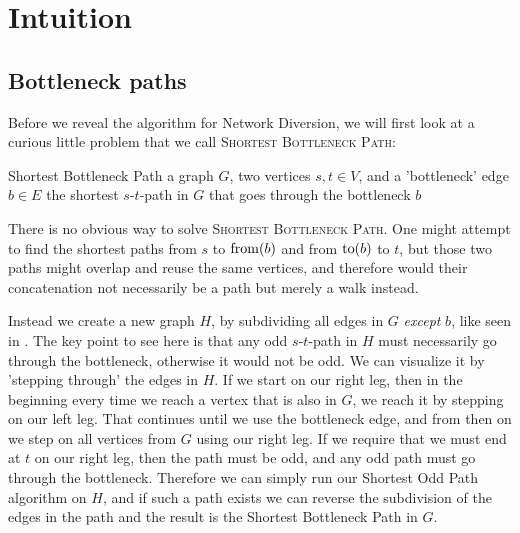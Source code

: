 \section{Intuition}
\subsection{Bottleneck paths}
\label{section:subdividing-bottlenecks}
Before we reveal the algorithm for Network Diversion, we will first look at a curious little problem that we call \textsc{Shortest Bottleneck Path}:

\problem
{Shortest Bottleneck Path}
{a graph $G$, two vertices $s,t \in V$, and a 'bottleneck' edge $b \in E$}
{the shortest $s$-$t$-path in $G$ that goes through the bottleneck $b$}


There is no obvious way to solve \textsc{Shortest Bottleneck Path}. One might attempt to find the shortest paths from $s$ to $\operatorname{from}(b)$ and from $\operatorname{to}(b)$ to $t$, but those two paths might overlap and reuse the same vertices, and therefore would their concatenation not necessarily be a path but merely a walk instead.

Instead we create a new graph $H$, by subdividing all edges in $G$ \emph{except} $b$, like seen in . The key point to see here is that any odd $s$-$t$-path in $H$ must necessarily go through the bottleneck, otherwise it would not be odd. We can visualize it by 'stepping through' the edges in $H$. If we start on our right leg, then in the beginning every time we reach a vertex that is also in $G$, we reach it by stepping on our left leg. That continues until we use the bottleneck edge, and from then on we step on all vertices from $G$ using our right leg. If we require that we must end at $t$ on our right leg, then the path must be odd, and any odd path must go through the bottleneck. Therefore we can simply run our Shortest Odd Path algorithm on $H$, and if such a path exists we can reverse the subdivision of the edges in the path and the result is the Shortest Bottleneck Path in $G$.

